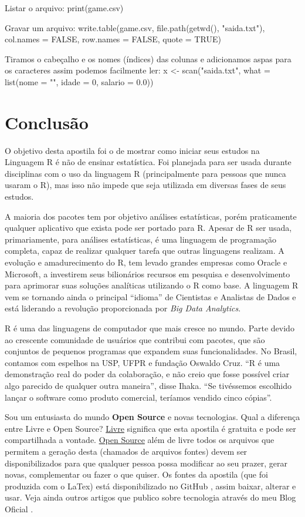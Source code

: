 \documentclass[a4paper,11pt]{article}
\begin{document}
Listar o arquivo:
{\ttfamily print(game.csv)}

Gravar um arquivo:
{\ttfamily write.table(game.csv, file.path(getwd(), "saida.txt"), col.names = FALSE, row.names = FALSE, quote = TRUE)}

Tiramos o cabeçalho e os nomes (índices) das colunas e adicionamos aspas para os caracteres assim podemos facilmente ler:
{\ttfamily x <- scan("saida.txt", what = list(nome = "", idade = 0, salario = 0.0))}

\section{Conclusão}
O objetivo desta apostila foi o de mostrar como iniciar seus estudos na Linguagem R é não de ensinar estatística. Foi planejada para ser usada durante disciplinas com o uso da linguagem R (principalmente para pessoas que nunca usaram o R), mas isso não impede que seja utilizada em diversas fases de seus estudos.

A maioria dos pacotes tem por objetivo análises estatísticas, porém praticamente qualquer aplicativo que exista pode ser portado para R. Apesar de R ser usada, primariamente, para análises estatísticas, é uma linguagem de programação completa, capaz de realizar qualquer tarefa que outras linguagens realizam. A evolução e amadurecimento do R, tem levado grandes empresas como Oracle e Microsoft, a investirem seus bilionários recursos em pesquisa e desenvolvimento para aprimorar suas soluções analíticas utilizando o R como base. A linguagem R vem se tornando ainda o principal ``idioma'' de Cientistas e Analistas de Dados e está liderando a revolução proporcionada por \textit{Big Data Analytics}.

R é uma das linguagens de computador que mais cresce no mundo. Parte devido ao crescente comunidade de usuários que contribui com pacotes, que são conjuntos de pequenos programas que expandem suas funcionalidades. No Brasil, contamos com espelhos na USP, UFPR e fundação Oswaldo Cruz. ``R é uma demonstração real do poder da colaboração, e não creio que fosse possível criar algo parecido de qualquer outra maneira'', disse Ihaka. ``Se tivéssemos escolhido lançar o software como produto comercial, teríamos vendido cinco cópias''. 

Sou um entusiasta do mundo \textbf{Open Source} e novas tecnologias. Qual a diferença entre Livre e Open Source? \underline{Livre} significa que esta apostila é gratuita e pode ser compartilhada a vontade. \underline{Open Source} além de livre todos os arquivos que permitem a geração desta (chamados de arquivos fontes) devem ser disponibilizados para que qualquer pessoa possa modificar ao seu prazer, gerar novas, complementar ou fazer o que quiser. Os fontes da apostila (que foi produzida com o LaTex) está disponibilizado no GitHub \cite{github}, assim baixar, alterar e usar. Veja ainda outros artigos que publico sobre tecnologia através do meu Blog Oficial \cite{fernandoanselmo}.
\end{document}
